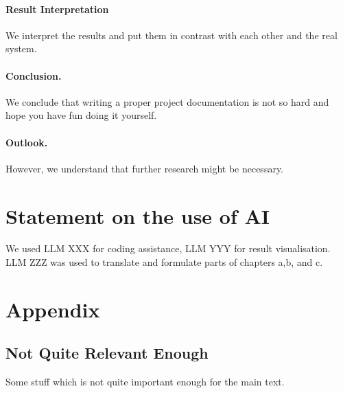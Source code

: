 \documentclass[a4paper,11pt]{scrartcl}
\begin{document}
\paragraph{Result Interpretation}
We interpret the results and put them in contrast with each other and the real system. 
\paragraph{Conclusion.} We conclude that writing a proper project documentation is not so hard and hope you have fun doing it yourself. 
\paragraph{Outlook.} However, we understand that further research might be necessary.
\newpage

\section*{Statement on the use of AI}
We used LLM XXX for coding assistance, LLM YYY for result visualisation. LLM ZZZ was used to translate and formulate parts of chapters a,b, and c.




\appendix
\section{Appendix}
\subsection{Not Quite Relevant Enough}
Some stuff which is not quite important enough for the main text.
\end{document}
